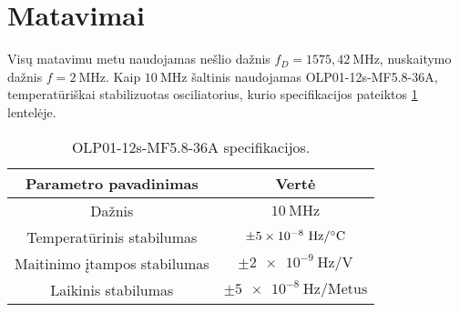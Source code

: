 \documentclass[../gnss_interference_resistant_thesis.tex]{subfiles}
\begin{document}
\section{Matavimai}

Visų matavimu metu naudojamas nešlio dažnis
$f_D = 1575,42\ \mathrm{MHz}$, nuskaitymo dažnis $f = 2\ \mathrm{MHz}$.
Kaip $10\ \mathrm{MHz}$ šaltinis
naudojamas OLP01-12s-MF5.8-36A, temperatūriškai stabilizuotas osciliatorius,
kurio specifikacijos pateiktos \ref{tab:clock_source_spec} lentelėje.


\begin{table}[h]
    \protect\caption{\label{tab:clock_source_spec}OLP01-12s-MF5.8-36A specifikacijos.}
    \centering{}%
    \begin{tabular}{| c | c |}
    \hline
    Parametro pavadinimas & Vertė \\
    \hline
    Dažnis                         & $10\ \mathrm{MHz}$ \\
    Temperatūrinis stabilumas      & $\pm \num{5e-8}\ \mathrm{Hz/\degree C}$ \\
    Maitinimo įtampos stabilumas   & $\pm \num{2e-9}\ \mathrm{Hz/V}$ \\
    Laikinis stabilumas             & $\pm \num{5e-8}\ \mathrm{Hz/Metus}$ \\
    \hline
    \end{tabular}
\end{table}






% 
\end{document}
